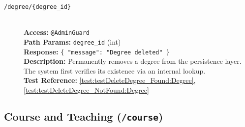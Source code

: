 \begin{description}
	\item[\DELETE \quad \texttt{/degree/\{degree\_id\}}] \hfill \\
	\textbf{Access:} \texttt{@AdminGuard} \\
	\textbf{Path Params:} \texttt{degree\_id} (int) \\
	\textbf{Response:} \texttt{\{ "message": "Degree deleted" \}} \\
	\textbf{Description:} Permanently removes a degree from the persistence layer. The system first verifies its existence via an internal lookup.\\
	\textbf{Test Reference:} \ref{test:testDeleteDegree_Found:Degree}, \ref{test:testDeleteDegree_NotFound:Degree}
\end{description}

\subsection{Course and Teaching (\texttt{/course})}

